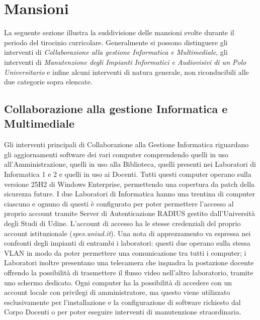 \setcounter{chapter}{3}
\setcounter{section}{0}

\chapter{Mansioni}
        \par
            La seguente sezione illustra la suddivisione delle mansioni svolte durante il periodo del tirocinio curricolare. Generalmente si possono distinguere gli interventi di \textit{Collaborazione alla gestione Informatica e Multimediale}, gli interventi di \textit{Manutenzione degli Impianti Informatici e Audiovisivi di un Polo Universitario} e infine alcuni interventi di natura generale, non riconducibili alle due categorie sopra elencate. 
        \section{Collaborazione alla gestione Informatica e Multimediale}
            \par
                Gli interventi principali di Collaborazione alla Gestione Informatica riguardano gli aggiornamenti software dei vari computer comprendendo quelli in uso all'Amministrazione, quelli in uso alla Biblioteca, quelli presenti nei Laboratori di Informatica 1 e 2 e quelli in uso ai Docenti. Tutti questi computer operano sulla versione 25H2 di Windows Enterprise, permettendo una copertura da patch della sicurezza future. I due Laboratori di Informatica hanno una trentina di computer ciascuno e ognuno di questi è configurato per poter permettere l'accesso al proprio account tramite Server di Autenticazione RADIUS gestito dall'Università degli Studi di Udine. L'account di accesso ha le stesse credenziali del proprio account istituzionale (\emph{spes.uniud.it}). Una nota di apprezzamento va espressa nei confronti degli impianti di entrambi i laboratori: questi due operano sulla stessa VLAN in modo da poter permettere una comunicazione tra tutti i computer; i Laboratori inoltre presentano una telecamera che inquadra la postazione docente offrendo la possibilità di trasmettere il flusso video nell'altro laboratorio, tramite uno schermo dedicato.  \newline
                Ogni computer ha la possibilità di accedere con un account locale con privilegi di amministratore, ma questo viene utilizzato esclusivamente per l'installazione e la configurazione di software richiesto dal Corpo Docenti o per poter eseguire interventi di manutenzione straordinaria. 
